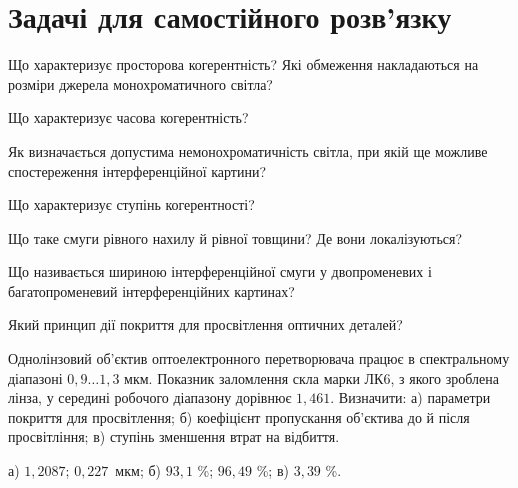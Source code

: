 \section{Задачі для самостійного розв’язку}


\begin{problem}%
Що характеризує просторова когерентність? Які обмеження
накладаються на розміри джерела монохроматичного світла?
\end{problem}

\begin{problem}%
Що характеризує часова когерентність?
\end{problem}

\begin{problem}%
Як визначається допустима немонохроматичність світла, при якій ще
можливе спостереження інтерференційної картини?
\end{problem}

\begin{problem}%
Що характеризує ступінь когерентності?
\end{problem}


\begin{problem}%
Що таке смуги рівного нахилу й рівної товщини? Де вони
локалізуються?
\end{problem}


\begin{problem}%
Що називається шириною інтерференційної смуги у двопроменевих і
багатопроменевий інтерференційних картинах?
\end{problem}


\begin{problem}%
Який принцип дії покриття для просвітлення оптичних деталей?
\end{problem}


\begin{problem}%
Однолінзовий об'єктив оптоелектронного перетворювача працює в
спектральному діапазоні $0,9 \ldots 1,3$ мкм. Показник заломлення скла марки
ЛК6, з якого зроблена лінза, у середині робочого діапазону дорівнює
$1,461$. Визначити: а) параметри покриття для просвітлення; б)
коефіцієнт пропускання об'єктива до й після просвітління; в) ступінь
зменшення втрат на відбиття.
\begin{solution}
	а) $ 1,2087 $; $ 0,227 $~мкм; б) $ 93,1 $ \%; $ 96,49 $ \%; в) $ 3,39 $ \%.
\end{solution}
\end{problem}


